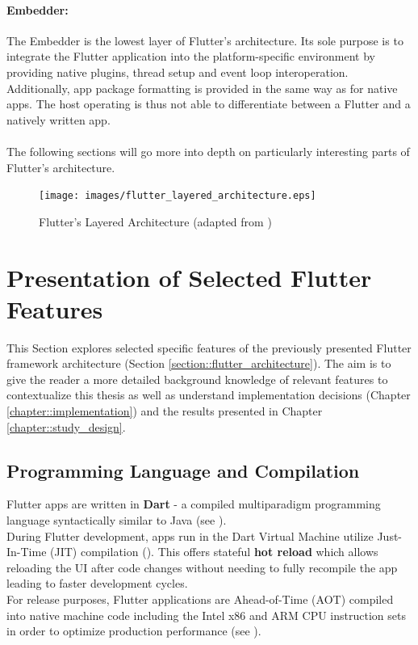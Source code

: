 \paragraph*{Embedder:}
The Embedder is the lowest layer of Flutter's architecture. Its sole purpose is to integrate the Flutter application into the platform-specific environment
by providing native plugins, thread setup and event loop interoperation.
Additionally, app package formatting is provided in the same way as for native apps. 
The host operating is thus not able to differentiate between a Flutter and a natively written app.
\paragraph{}
The following sections will go more into depth on particularly interesting parts of Flutter's architecture.

\begin{figure}
    \centering
    \texttt{[image: images/flutter\_layered\_architecture.eps]}
    \caption{Flutter's Layered Architecture (adapted from \cite{FlutterArchitecture2021})}
    \label{fig:flutter_layered_architecture}
\end{figure}

\section{Presentation of Selected Flutter Features}
This Section explores selected specific features of the previously presented Flutter framework architecture (Section \ref{section::flutter_architecture}).
The aim is to give the reader a more detailed background knowledge of relevant features to contextualize this thesis as well as understand implementation decisions (Chapter \ref{chapter::implementation}) and the results presented in Chapter \ref{chapter::study_design}.


\subsection{Programming Language and Compilation} \label{section::programming_language}
Flutter apps are written in \textbf{Dart} - a compiled multiparadigm programming language syntactically similar to Java (see \cite{DartLanguage2021}).\\
During Flutter development, apps run in the Dart Virtual Machine utilize Just-In-Time (JIT) compilation (\cite{DartLanguage2021}). 
This offers stateful \textbf{hot reload} which allows reloading the UI after code changes without needing to fully recompile the app leading to faster development cycles.\\
For release purposes, Flutter applications are Ahead-of-Time (AOT) compiled into native machine code including the Intel x86 and ARM CPU instruction sets in order to optimize production performance
(see \cite{FlutterArchitecture2021}).


